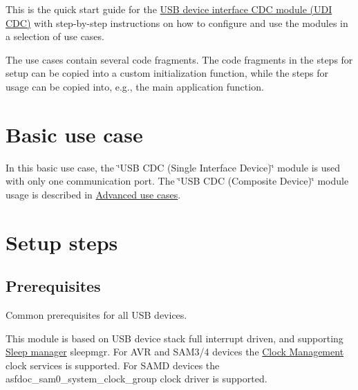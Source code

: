 This is the quick start guide for the \hyperlink{group__udi__cdc__group}{U\-S\-B device interface C\-D\-C module (U\-D\-I C\-D\-C)} with step-\/by-\/step instructions on how to configure and use the modules in a selection of use cases.

The use cases contain several code fragments. The code fragments in the steps for setup can be copied into a custom initialization function, while the steps for usage can be copied into, e.\-g., the main application function.\hypertarget{udi_cdc_quickstart_udi_cdc_basic_use_case}{}\section{Basic use case}\label{udi_cdc_quickstart_udi_cdc_basic_use_case}
In this basic use case, the \char`\"{}\-U\-S\-B C\-D\-C (\-Single Interface Device)\char`\"{} module is used with only one communication port. The \char`\"{}\-U\-S\-B C\-D\-C (\-Composite Device)\char`\"{} module usage is described in \hyperlink{udi_cdc_quickstart_udi_cdc_use_cases}{Advanced use cases}.\hypertarget{udi_cdc_quickstart_udi_cdc_basic_use_case_setup}{}\section{Setup steps}\label{udi_cdc_quickstart_udi_cdc_basic_use_case_setup}
\hypertarget{udi_cdc_quickstart_udi_cdc_basic_use_case_setup_prereq}{}\subsection{Prerequisites}\label{udi_cdc_quickstart_udi_cdc_basic_use_case_setup_prereq}
Common prerequisites for all U\-S\-B devices.

This module is based on U\-S\-B device stack full interrupt driven, and supporting \hyperlink{group__sleepmgr__group}{Sleep manager} sleepmgr. For A\-V\-R and S\-A\-M3/4 devices the \hyperlink{group__clk__group}{Clock Management} clock services is supported. For S\-A\-M\-D devices the asfdoc\-\_\-sam0\-\_\-system\-\_\-clock\-\_\-group clock driver is supported.

